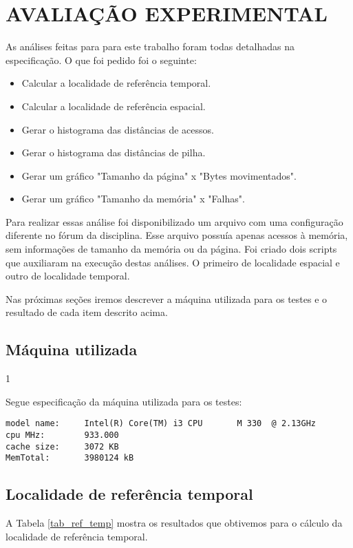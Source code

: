 \documentclass[12pt]{article}
\begin{document}
\section{AVALIAÇÃO EXPERIMENTAL}
\label{avaliacao_experimental}

As análises feitas para para este trabalho foram todas detalhadas na especificação. O que foi pedido foi o seguinte:

\begin{itemize}
\item Calcular a localidade de referência temporal.
\item Calcular a localidade de referência espacial.
\item Gerar o histograma das distâncias de acessos.
\item Gerar o histograma das distâncias de pilha.
\item Gerar um gráfico "Tamanho da página" x "Bytes movimentados".
\item Gerar um gráfico "Tamanho da memória" x "Falhas".
\end{itemize}

Para realizar essas análise foi disponibilizado um arquivo com uma configuração diferente no fórum da disciplina. Esse arquivo possuía apenas acessos à memória, sem informações de tamanho da memória ou da página. Foi criado dois scripts que auxiliaram na execução destas análises. O primeiro de localidade espacial e outro de localidade temporal.

Nas próximas seções iremos descrever a máquina utilizada para os testes e o resultado de cada item descrito acima.

\subsection{Máquina utilizada}
\label{maquina}1

Segue especificação da máquina utilizada para os testes:
\begin{verbatim}
model name:     Intel(R) Core(TM) i3 CPU       M 330  @ 2.13GHz
cpu MHz:        933.000
cache size:     3072 KB
MemTotal:       3980124 kB
\end{verbatim}


\subsection{Localidade de referência temporal}
\label{loc_ref_temp}

A Tabela \ref{tab_ref_temp} mostra os resultados que obtivemos para o cálculo da localidade de referência temporal.
\end{document}
